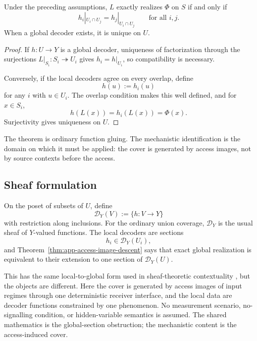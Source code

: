 \begin{theorem}
\label{thm:app-access-image-descent}
Under the preceding assumptions, $L$ exactly realizes $\Phi$ on $S$ if and only if
\begin{equation}
 h_i|_{U_i\cap U_j}
=
h_j|_{U_i\cap U_j}
\qquad\text{for all }i,j.
\label{eq:app-access-image-descent}
\end{equation}
When a global decoder exists, it is unique on $U$.
\end{theorem}

\begin{proof}
If $h:U\to Y$ is a global decoder, uniqueness of factorization through the surjections $L|_{S_i}:S_i\twoheadrightarrow U_i$ gives $h_i=h|_{U_i}$, so compatibility is necessary.

Conversely, if the local decoders agree on every overlap, define
\[
h(u):=h_i(u)
\]
for any $i$ with $u\in U_i$. The overlap condition makes this well defined, and for $x\in S_i$,
\[
h(L(x))=h_i(L(x))=\Phi(x).
\]
Surjectivity gives uniqueness on $U$.
\end{proof}

The theorem is ordinary function gluing. The mechanistic identification is the domain on which it must be applied: the cover is generated by access images, not by source contexts before the access.

\subsection{Sheaf formulation}

On the poset of subsets of $U$, define
\[
\mathscr D_Y(V):=\{h:V\to Y\}
\]
with restriction along inclusions. For the ordinary union coverage, $\mathscr D_Y$ is the usual sheaf of $Y$-valued functions. The local decoders are sections
\[
h_i\in\mathscr D_Y(U_i),
\]
and Theorem~\ref{thm:app-access-image-descent} says that exact global realization is equivalent to their extension to one section of $\mathscr D_Y(U)$.

This has the same local-to-global form used in sheaf-theoretic contextuality \citep{abramsky2011sheaf}, but the objects are different. Here the cover is generated by access images of input regimes through one deterministic receiver interface, and the local data are decoder functions constrained by one phenomenon. No measurement scenario, no-signalling condition, or hidden-variable semantics is assumed. The shared mathematics is the global-section obstruction; the mechanistic content is the access-induced cover.

